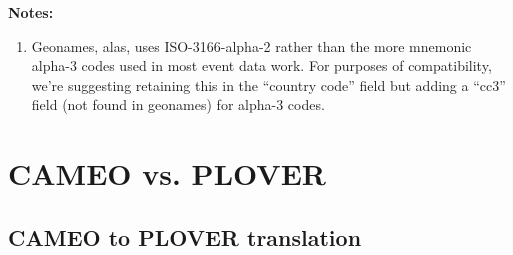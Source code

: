 \documentclass[11pt]{report}
\begin{document}
\begin{table}[htp]
\noindent \textbf{Notes:}
\begin{enumerate}
\item Geonames, alas, uses ISO-3166-alpha-2 rather than the more mnemonic alpha-3 codes used in most event data work. For purposes 
of compatibility, we're suggesting retaining this in the ``country code'' field but adding a ``cc3'' field (not found in geonames) for
alpha-3 codes.
\end{enumerate}
\end{table}

\clearpage




\chapter{CAMEO vs. PLOVER}

\section{CAMEO to PLOVER translation}
\end{document}
